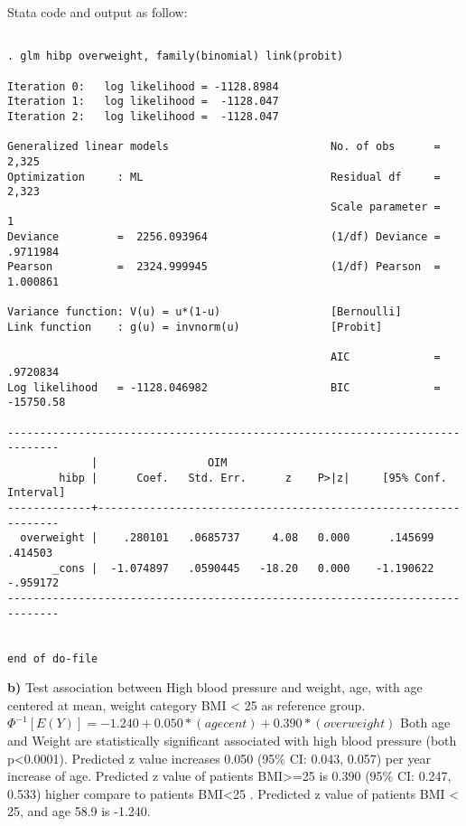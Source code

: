 \documentclass{article}
\begin{document}
Stata code and output as follow:
\begin{verbatim}

. glm hibp overweight, family(binomial) link(probit)

Iteration 0:   log likelihood = -1128.8984  
Iteration 1:   log likelihood =  -1128.047  
Iteration 2:   log likelihood =  -1128.047  

Generalized linear models                         No. of obs      =      2,325
Optimization     : ML                             Residual df     =      2,323
                                                  Scale parameter =          1
Deviance         =  2256.093964                   (1/df) Deviance =   .9711984
Pearson          =  2324.999945                   (1/df) Pearson  =   1.000861

Variance function: V(u) = u*(1-u)                 [Bernoulli]
Link function    : g(u) = invnorm(u)              [Probit]

                                                  AIC             =   .9720834
Log likelihood   = -1128.046982                   BIC             =  -15750.58

------------------------------------------------------------------------------
             |                 OIM
        hibp |      Coef.   Std. Err.      z    P>|z|     [95% Conf. Interval]
-------------+----------------------------------------------------------------
  overweight |    .280101   .0685737     4.08   0.000      .145699     .414503
       _cons |  -1.074897   .0590445   -18.20   0.000    -1.190622    -.959172
------------------------------------------------------------------------------


end of do-file

\end{verbatim}

\textbf{b)}
Test association between High blood pressure and weight, age, with age centered at mean, weight category BMI < 25 as reference group.  \\
$\Phi^{-1}[E(Y)]=-1.240+0.050*(agecent)+0.390*(overweight)$
Both age and Weight are statistically significant associated with high blood pressure (both p<0.0001). Predicted z value increases 0.050 (95\% CI: 0.043, 0.057) per year increase of age. Predicted z value of patients BMI>=25 is 0.390 (95\% CI: 0.247, 0.533) higher compare to patients BMI<25 . Predicted z value of patients BMI < 25, and age 58.9 is -1.240.
\end{document}
